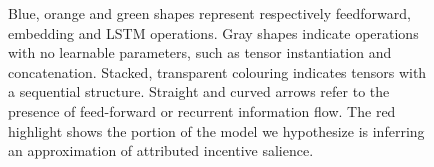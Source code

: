 \begin{figure}[ht]
\begin{center}
\begin{adjustbox}{width=0.8\textwidth}
\begin{tikzpicture}[x=0.75pt,y=0.75pt,yscale=-1,xscale=1]
\end{tikzpicture}

\end{adjustbox}
\end{center}
\caption[\textbf{The bifurcating model (BM) architecture}]{Blue, orange and green shapes represent respectively feedforward, embedding and LSTM operations. Gray shapes indicate operations with no learnable parameters, such as tensor instantiation and concatenation. Stacked, transparent colouring indicates tensors with a sequential structure. Straight and curved arrows refer to the presence of feed-forward or recurrent information flow. The red highlight shows the portion of the model we hypothesize is inferring an approximation of attributed incentive salience.}
\label{fig: rnn_1}
\end{figure}